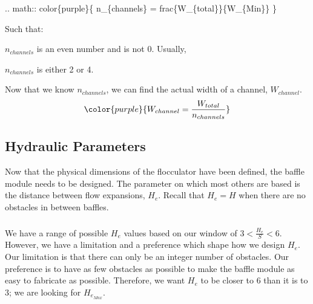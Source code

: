 \documentclass[letterpaper,10pt,english]{sphinxmanual}
\begin{document}
\begin{DUlineblock}{0em}
\item[] .. math::
color\{purple\}\{
  n\_\{channels\} = frac\{W\_\{total\}\}\{W\_\{Min\}\}
  \}
\item[] Such that:
\item[] \(n_{channels}\) is an even number and is not 0. Usually,
\item[] \(n_{channels}\) is either 2 or 4.
\end{DUlineblock}

Now that we know \(n_{channels}\), we can find the actual width of a channel, \(W_{channel}\).
\begin{equation}\label{equation:Flocculation/Floc_Design:Flocculation/Floc_Design:29}
\begin{split}\color{purple}{
  W_{channel} = \frac{W_{total}}{n_{channels}}
  }\end{split}
\end{equation}

\subsection{Hydraulic Parameters}
\label{\detokenize{Flocculation/Floc_Design:hydraulic-parameters}}
Now that the physical dimensions of the flocculator have been defined, the baffle module needs to be designed. The parameter on which most others are based is the distance between flow expansions, \(H_e\). Recall that \(H_e = H\) when there are no obstacles in between baffles.


\subsubsection{}
\label{\detokenize{Flocculation/Floc_Design:height-between-expansions-math-h-e-and-number-of-obstacles-per-baffle-space-math-n-obstacles}}
We have a range of possible \(H_e\) values based on our window of \(3 < \frac{H_e}{S} < 6\). However, we have a limitation and a preference which shape how we design \(H_e\). Our limitation is that there can only be an integer number of obstacles. Our preference is to have as few obstacles as possible to make the baffle module as easy to fabricate as possible. Therefore, we want \(H_e\) to be closer to \(6\) than it is to \(3\); we are looking for \(H_{e_{Max}}\).
\end{document}
